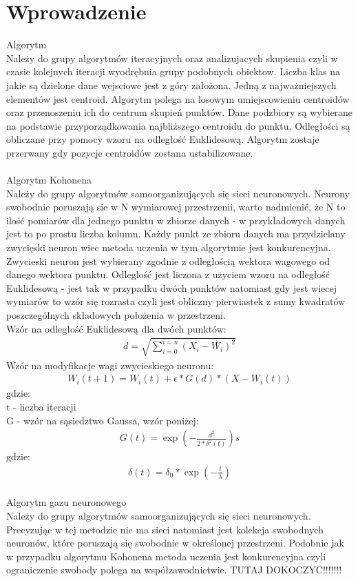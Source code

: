 \documentclass{classrep}
\begin{document}
\section{Wprowadzenie}
{Algorytm \\
Należy do grupy algorytmów iteracyjnych oraz analizujacych skupienia czyli w czasie kolejnych iteracji wyodrębnia grupy podobnych obiektow. Liczba klas na jakie są dzielone dane wejsciowe jest z góry założona. Jedną z najważniejszych elementów jest centroid. Algorytm polega na losowym umiejscowieniu centroidów oraz przenoszeniu ich do centrum skupień punktów. Dane podzbiory są wybierane na podstawie przyporządkowania najbliższego centroidu do punktu. Odległości są obliczane przy pomocy wzoru na odległość Euklidesową. Algorytm zostaje przerwany gdy pozycje centroidów zostana ustabilizowane.\\\\

Algorytm Kohonena\\
Należy do grupy algorytmów samoorganizujących się sieci neuronowych. Neurony swobodnie poruszają sie w N wymiarowej przestrzenii, warto nadmienić, że N to ilość pomiarów dla jednego punktu w zbiorze danych - w przykładowych danych jest to po prostu liczba kolumn. Każdy punkt ze zbioru danych ma przydzielany zwycięski neuron wiec metoda uczenia w tym algorytmie jest konkurencyjna. Zwycieski neuron jest wybierany zgodnie z odległością wektora wagowego od danego wektora punktu. Odleglość jest liczona z użyciem wzoru na odległość Euklidesową - jest tak w przypadku dwóch punktów natomiast gdy jest wiecej wymiarów to wzór się rozrasta czyli jest obliczny pierwiastek z sumy kwadratów poszczególnych składowych położenia w przestrzeni. \\

Wzór na odległość Euklidesową dla dwóch punktów: 
\begin{align*}
d=\displaystyle\sqrt{\sum_{i=0}^{i=n} {(X_i - W_i)^2}}
\end{align*}
Wzór na modyfikacje wagi zwycieskiego neuronu: 
\begin{align*}
W_i(t + 1) = W_i(t) + \epsilon * G(d)* (X - W_i(t))
\end{align*}
gdzie:\\
t - liczba iteracji\\
G - wzór na sąsiedztwo Gaussa, wzór poniżej:
\begin{align*}
G(t) = \exp (-\frac{d^2} {2* \delta^2(t)})s
\end{align*}
gdzie:
\begin{align*}
\delta(t) = \delta_0 * \exp (-\frac {t} { \lambda })
\end{align*}
\\
Algorytm gazu neuronowego\\
Należy do grupy algorytmów samoorganizujących się sieci neuronowych. Precyzując w tej metodzie nie ma sieci natomiast jest kolekcja swobodnych neuronów, które poruszają się swobodnie w określonej przestrzeni. Podobnie jak w przypadku algorytmu Kohonena metoda uczenia jest konkurencyjna czyli ograniczenie swobody polega na współzawodnictwie. TUTAJ DOKOCZYC!!!!!!! \\

}
\end{document}
